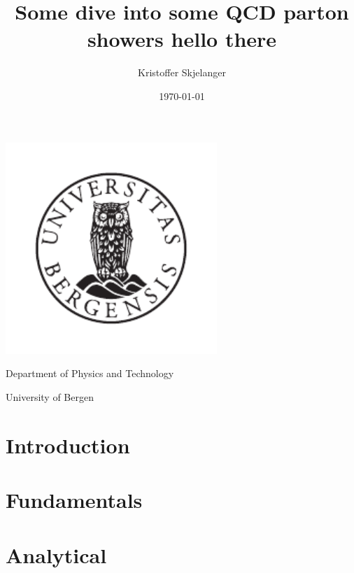\documentclass{article}
\title{\Huge{Some dive into some QCD parton showers} 
        \endgraf 
        \Large{hello there}}
\author{Kristoffer Skjelanger}
\date{\today}
\begin{document}
    \begin{titlepage}
    \maketitle
    \thispagestyle{empty}
    \vspace*{\fill}
    \begin{center}
        \includegraphics[width=8cm]{pictures/UiB-emblem_gray.pdf}
        \vspace*{\fill}
        
        \Large{Department of Physics and Technology

        University of Bergen}
    \end{center}
    \vfill
    
    \newpage
    \tableofcontents    
    \thispagestyle{empty}
    \end{titlepage}

    \newpage
    \chapter*{Introduction}\label{cpt:intro}
        
    \newpage    
    \chapter{Fundamentals}
        
    \newpage
    \chapter{Analytical}
        
    \newpage
\end{document}
